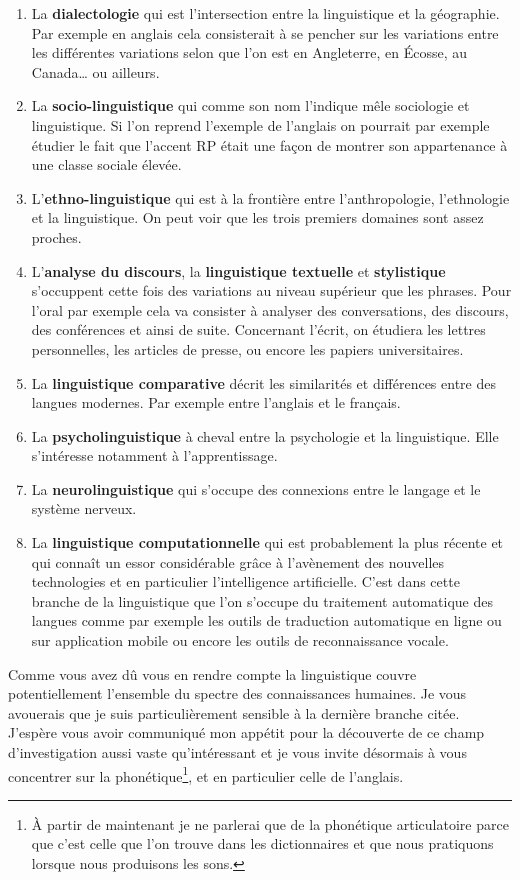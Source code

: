 \begin{enumerate}
\item La \textbf{dialectologie} qui est l'intersection entre la
  linguistique et la géographie. Par exemple en anglais cela
  consisterait à se pencher sur les variations entre les différentes
  variations selon que l'on est en Angleterre, en \'Ecosse, au
  Canada\dots{} ou ailleurs.
\item La \textbf{socio-linguistique} qui comme son nom l'indique mêle
  sociologie et linguistique. Si l'on reprend l'exemple de l'anglais
  on pourrait par exemple étudier le fait que l'accent RP était une
  façon de montrer son appartenance à une classe sociale élevée.
\item L'\textbf{ethno-linguistique} qui est à la frontière entre
  l'anthropologie, l'ethnologie et la linguistique. On peut voir que les
  trois premiers domaines sont assez proches.
\item L'\textbf{analyse du discours}, la \textbf{linguistique
    textuelle} et \textbf{stylistique} s'occuppent cette fois des
  variations au niveau supérieur que les phrases. Pour l'oral par
  exemple cela va consister à analyser des conversations, des
  discours, des conférences et ainsi de suite. Concernant l'écrit, on
  étudiera les lettres personnelles, les articles de presse, ou encore
  les papiers universitaires.
\item La \textbf{linguistique comparative} décrit les similarités et
  différences entre des langues modernes. Par exemple entre l'anglais
  et le français.
\item La \textbf{psycholinguistique} à cheval entre la psychologie et
  la linguistique. Elle s'intéresse notamment à l'apprentissage.
\item La \textbf{neurolinguistique} qui s'occupe des connexions entre
  le langage et le système nerveux.
\item La \textbf{linguistique computationnelle} qui est probablement
  la plus récente et qui connaît un essor considérable grâce à
  l'avènement des nouvelles technologies et en particulier
  l'intelligence artificielle. C'est dans cette branche de la
  linguistique que l'on s'occupe du traitement automatique des langues
  comme par exemple les outils de traduction automatique en ligne ou
  sur application mobile ou encore les outils de reconnaissance
  vocale.   
\end{enumerate}

Comme vous avez dû vous en rendre compte la linguistique couvre
potentiellement l'ensemble du spectre des connaissances humaines. Je
vous avouerais que je suis particulièrement sensible à la dernière
branche citée. J'espère vous avoir communiqué mon appétit pour la
découverte de ce champ d'investigation aussi vaste qu'intéressant et
je vous invite désormais à vous concentrer sur la
phonétique\footnote{À partir de maintenant je ne parlerai que de la
  phonétique articulatoire parce que c'est celle que l'on trouve dans
  les dictionnaires et que nous pratiquons lorsque nous produisons les
  sons.}, et en particulier celle de l'anglais.

